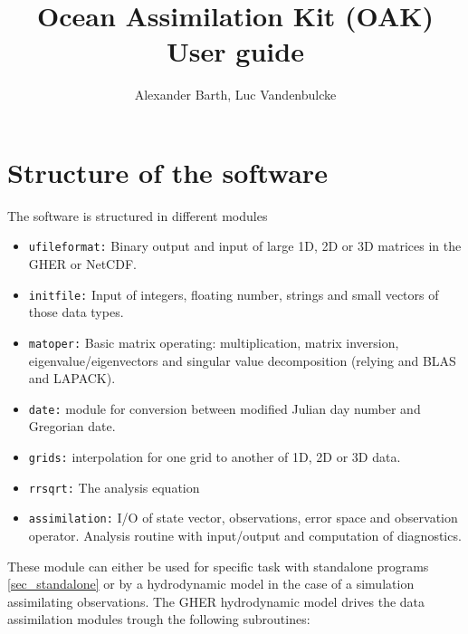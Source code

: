 \documentclass[a4paper,12pt]{article}
\newcommand{\code}{\texttt}
\begin{document}
\setlength{\parindent}{0cm}
\newcommand{\tabularcol}{|p{0.3\textwidth}|p{0.2\textwidth}|p{0.5\textwidth}|}

\title{Ocean Assimilation Kit (OAK) \\ User guide}
\author{Alexander Barth, Luc Vandenbulcke}
\maketitle



\section{Structure of the software}

The software is structured in different modules

\begin{itemize}

\item \code{ufileformat:} Binary output and input of large 1D, 2D or 3D
matrices in the GHER or NetCDF.
\item \code{initfile:} Input of integers, floating number, strings and small
vectors of those data types.
\item \code{matoper:} Basic matrix operating: multiplication, matrix
  inversion, eigenvalue/eigenvectors and singular value decomposition
  (relying and BLAS and LAPACK).
\item \code{date:} module for conversion between modified Julian day number
  and Gregorian date.
\item \code{grids:} interpolation for one grid to another of 1D, 2D or
  3D data.
\item \code{rrsqrt:} The analysis equation
\item \code{assimilation:} I/O of state vector, observations, error
  space and observation operator. Analysis routine with input/output
  and computation of diagnostics.
\end{itemize}

These module can either be used for specific task with standalone programs \ref{sec_standalone} or by a hydrodynamic model
in the case of a simulation assimilating observations. The GHER
hydrodynamic model drives the data assimilation modules trough the
following subroutines:
\end{document}
